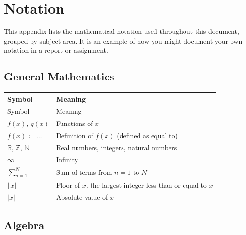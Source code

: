 \section{Notation}

This appendix lists the mathematical notation used throughout this document, grouped by subject area. It is an example of how you might document your own notation in a report or assignment.

	\subsection{General Mathematics}
	
	\begin{tabularx}{\linewidth}{@{}ll@{}}
		\caption{General mathematical notation.}
		\label{tab:notation-general} \\
		\toprule
		Symbol & Meaning \\
		\midrule
		\endfirsthead
		\toprule
		Symbol & Meaning \\
		\midrule
		\endhead
		\bottomrule
		\endfoot
		\bottomrule
		\endlastfoot
		$f(x)$, $g(x)$              & Functions of $x$ \\
		
		$f(x) \coloneqq \ldots$     & Definition of $f(x)$ (defined as equal to) \\
		
		$\mathbb{R}$, $\mathbb{Z}$, $\mathbb{N}$ & Real numbers, integers, natural numbers \\
		
		$\infty$                    & Infinity \\
		
		$\sum_{n=1}^{N}$            & Sum of terms from $n = 1$ to $N$ \\
		
		$\lfloor x \rfloor$         & Floor of $x$, the largest integer less than or equal to $x$ \\
		
		$|x|$                       & Absolute value of $x$ \\
	\end{tabularx}
	
	\subsection{Algebra}
	

